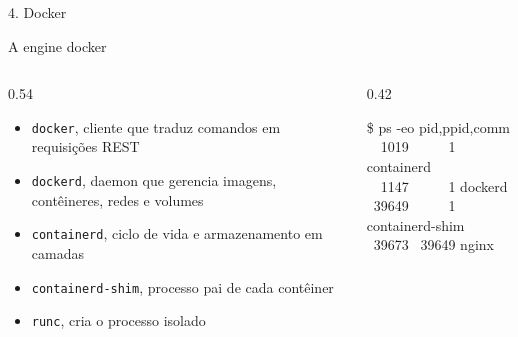 \documentclass[aspectratio=169]{beamer}
\newcommand{\divisor}[1]{%
\begin{frame}
  \begin{center}
    \begin{tcolorbox}[
        width=0.97\textwidth,
        colback=structure.fg!90!black,
        colframe=structure.fg!80!black,
        coltext=white,
        boxrule=0pt,
        arc=3mm,
        drop shadow,
        halign=center,
        top=4mm,
        bottom=4mm
      ]
      {\Large #1\par}
    \end{tcolorbox}
  \end{center}
\end{frame}}
\begin{document}
\divisor{4. Docker}

\begin{frame}{A engine docker}
  \begin{columns}[T]
    \begin{column}{0.54\textwidth}
      \begin{itemize}
        \item \texttt{docker}, cliente que traduz comandos em requisições REST
        \item \texttt{dockerd}, daemon que gerencia imagens, contêineres, redes e volumes
        \item \texttt{containerd}, ciclo de vida e armazenamento em camadas
        \item \texttt{containerd-shim}, processo pai de cada contêiner
        \item \texttt{runc}, cria o processo isolado
      \end{itemize}
    \end{column}
    \begin{column}{0.42\textwidth}
      \begin{tcolorbox}[colback=black!88, coltext=white, colframe=black, arc=2mm, fontupper=\tiny\ttfamily]
        \$ ps -eo pid,ppid,comm \\[2pt]
        \ \ 1019 \ \ \ \ \ 1 containerd \\
        \ \ 1147 \ \ \ \ \ 1 dockerd \\
        \ 39649 \ \ \ \ \ 1 containerd-shim \\
        \ 39673 \ 39649 nginx
      \end{tcolorbox}
    \end{column}
  \end{columns}
  \vspace{0.2cm}
\end{frame}
\end{document}
